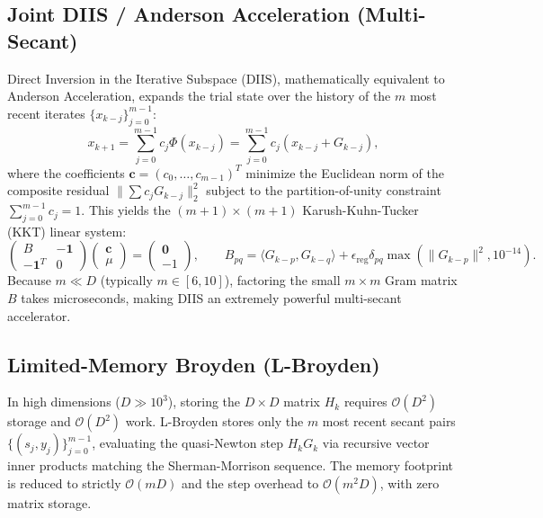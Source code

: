 \subsection{Joint DIIS / Anderson Acceleration (Multi-Secant)}
Direct Inversion in the Iterative Subspace (DIIS), mathematically equivalent to Anderson Acceleration, expands the trial state over the history of the $m$ most recent iterates $\{x_{k-j}\}_{j=0}^{m-1}$:
\begin{equation}
x_{k+1} = \sum_{j=0}^{m-1} c_j \Phi(x_{k-j}) = \sum_{j=0}^{m-1} c_j (x_{k-j} + G_{k-j}),
\end{equation}
where the coefficients $\mathbf{c} = (c_0, \dots, c_{m-1})^T$ minimize the Euclidean norm of the composite residual $\| \sum c_j G_{k-j} \|_2^2$ subject to the partition-of-unity constraint $\sum_{j=0}^{m-1} c_j = 1$.
This yields the $(m+1) \times (m+1)$ Karush-Kuhn-Tucker (KKT) linear system:
\begin{equation}
\begin{pmatrix}
B & -\mathbf{1} \\
-\mathbf{1}^T & 0
\end{pmatrix}
\begin{pmatrix}
\mathbf{c} \\
\mu
\end{pmatrix}
=
\begin{pmatrix}
\mathbf{0} \\
-1
\end{pmatrix},
\qquad
B_{pq} = \langle G_{k-p}, G_{k-q} \rangle + \epsilon_{\mathrm{reg}} \delta_{pq} \max(\|G_{k-p}\|^2, 10^{-14}).
\end{equation}
Because $m \ll D$ (typically $m \in [6, 10]$), factoring the small $m \times m$ Gram matrix $B$ takes microseconds, making DIIS an extremely powerful multi-secant accelerator.

\subsection{Limited-Memory Broyden (L-Broyden)}
In high dimensions ($D \gg 10^3$), storing the $D \times D$ matrix $H_k$ requires $\mathcal{O}(D^2)$ storage and $\mathcal{O}(D^2)$ work.
L-Broyden stores only the $m$ most recent secant pairs $\{(s_j, y_j)\}_{j=0}^{m-1}$, evaluating the quasi-Newton step $H_k G_k$ via recursive vector inner products matching the Sherman-Morrison sequence.
The memory footprint is reduced to strictly $\mathcal{O}(mD)$ and the step overhead to $\mathcal{O}(m^2 D)$, with zero matrix storage.

